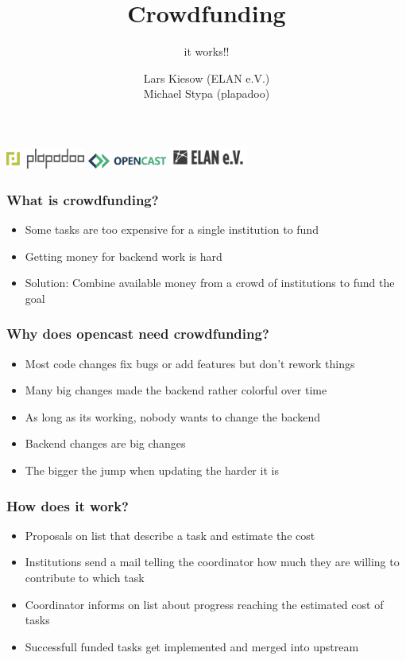 \documentclass[t,aspectratio=43]{beamer}
\title{Crowdfunding}
\subtitle{it works!!}
\author{Lars Kiesow (ELAN e.V.)\\\vspace{1em}Michael Stypa (plapadoo)}
\begin{document}
\begin{frame}
  \titlepage
  \includegraphics[width=7em]{plapadoo.pdf}
  \hfill
  \includegraphics[width=7em]{opencast.pdf}
  \hfill
  \includegraphics[width=7em]{elan.pdf}
\end{frame}

\begin{frame}[c]
  \frametitle{What is crowdfunding?}
  \begin{itemize}
    \item Some tasks are too expensive for a single institution to fund
    \item Getting money for backend work is hard
    \item Solution: Combine available money from a crowd of institutions to fund the goal
  \end{itemize}
\end{frame}

\begin{frame}[c]
  \frametitle{Why does opencast need crowdfunding?}
  \begin{itemize}
    \item Most code changes fix bugs or add features but don't rework things
    \item Many big changes made the backend rather colorful over time
    \item As long as its working, nobody wants to change the backend
    \item Backend changes are big changes
    \item The bigger the jump when updating the harder it is
  \end{itemize}
\end{frame}

\begin{frame}[c]
  \frametitle{How does it work?}
  \begin{itemize}
    \item Proposals on list that describe a task and estimate the cost
    \item Institutions send a mail telling the coordinator how much they are willing to contribute to which task
    \item Coordinator informs on list about progress reaching the estimated cost of tasks
    \item Successfull funded tasks get implemented and merged into upstream
  \end{itemize}
\end{frame}
\end{document}
